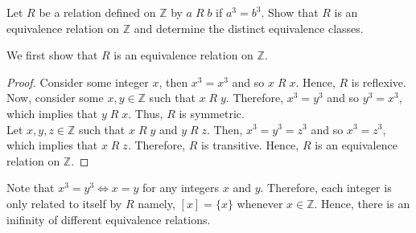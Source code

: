 \documentclass[12pt]{article}
\newcommand{\Z}{\mathbb{Z}}
\newenvironment{problem}[2][Problem]{\begin{trivlist}
		\item[\hskip \labelsep {\bfseries #1}\hskip \labelsep {\bfseries #2.}]}{\end{trivlist}}
\newenvironment{solution}[2][Solution]{\begin{trivlist}
		\item[\hskip \labelsep {\bfseries #1}\hskip \labelsep {\bfseries #2.}]}{\end{trivlist}}
\begin{document}
	\begin{problem}{27}
		Let $R$ be a relation defined on $\Z$ by $a \; R \; b$ if $a^{3} = b^{3}$. Show that $R$ is an equivalence relation on $\Z$ and determine the distinct equivalence classes.
		\begin{solution}{27}
		We first show that $R$ is an equivalence relation on $\Z$.
		\begin{proof}
			 Consider some integer $x$, then $x^{3} = x^{3}$ and so $x\; R \; x$. Hence, $R$ is reflexive.\\
			Now, consider some $x,y\in \Z$ such that $x \; R \; y$. Therefore, $x^{3} = y^{3}$ and so $y^{3} = x^{3}$, which implies that $y\; R \;x$. Thus, $R$ is symmetric.\\
			Let $x,y,z\in \Z$ such that $x\; R \; y$ and $y\; R \; z$. Then, $x^{3} = y^{3} = z^{3}$ and so $x^{3} = z^{3}$, which implies that $x\; R \;z$. Therefore, $R$ is transitive.
			Hence, $R$ is an equivalence relation on $\Z$.
		\end{proof} 
		Note that $x^{3} = y^{3} \iff x=y$ for any integers $x$ and $y$. Therefore, each integer is only related to itself by $R$ namely, $[x] =\{x\}$ whenever $x\in \Z$. Hence, there is an inifinity of different equivalence relations.  
		\end{solution}
	\end{problem}
\end{document}

